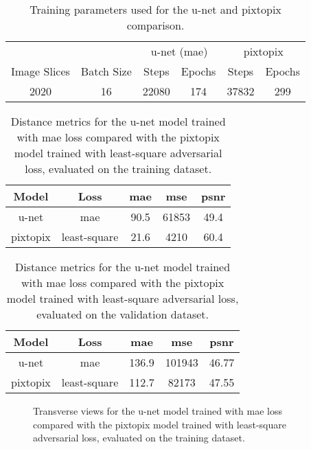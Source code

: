 \begin{table}[h]
  \centering
  \begin{tabular}{cccccc}
    \toprule
    & &
    \multicolumn{2}{c}{u-net (\gls{mae})} &
    \multicolumn{2}{c}{pixtopix} \\
    Image Slices & Batch Size & Steps & Epochs & Steps & Epochs \\
    \midrule
    \num{2020} & \num{16} & \num{22080} & \num{174} & \num{37832} & \num{299} \\
    \bottomrule
  \end{tabular}
  \caption{Training parameters used for the u-net and pixtopix comparison.
  }\label{tab:unet_pixtopix:params}
\end{table}
\begin{table}[h]
  \centering
  \begin{tabular}{ccccc}
    \toprule
    Model & Loss &
    \acrshort{mae} &
    \acrshort{mse} &
    \acrshort{psnr} \\
    \midrule
    u-net & \acrshort{mae} & \num{90.5} & \num{61853} & \num{49.4} \\
    pixtopix & least-square & \num{21.6} & \num{4210} & \num{60.4} \\
    \bottomrule
  \end{tabular}
  \caption{Distance metrics for the u-net model trained with \acrshort{mae}
    loss compared with the pixtopix model trained with least-square adversarial
    loss, evaluated on the training dataset.
  }\label{tab:unet_pixtopix:training}
\end{table}
\begin{table}[h]
  \centering
  \begin{tabular}{ccccc}
    \toprule
    Model & Loss &
    \acrshort{mae} &
    \acrshort{mse} &
    \acrshort{psnr} \\
    \midrule
    u-net & \acrshort{mae} & \num{136.9} & \num{101943} & \num{46.77} \\
    pixtopix & least-square & \num{112.7} & \num{82173} & \num{47.55} \\
    \bottomrule
  \end{tabular}
  \caption{Distance metrics for the u-net model trained with \acrshort{mae}
    loss compared with the pixtopix model trained with least-square adversarial
    loss, evaluated on the validation dataset.
  }\label{tab:unet_pixtopix:training}
\end{table}
\begin{figure}[h]
  \centering
  \begin{adjustbox}{width=\linewidth}
  \end{adjustbox}
  \caption{Transverse views for the u-net model trained with \acrshort{mae}
    loss compared with the pixtopix model trained with least-square adversarial
    loss, evaluated on the training dataset.
  }\label{fig:unet_pixtopix:training}
\end{figure}
